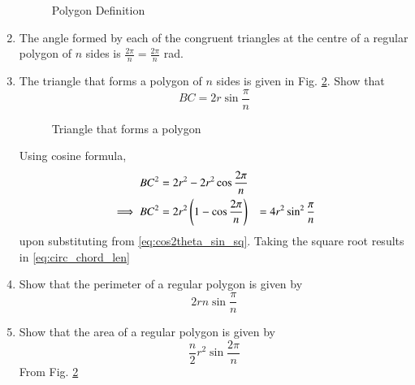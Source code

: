 \begin{enumerate}[label=\arabic*.,ref=\thesubsection.\theenumi]
\begin{figure}[!ht]
\begin{center}
		\resizebox{\columnwidth}{!}{}
	\end{center}
	\caption{Polygon Definition}
	\label{ch5_polygon_def}	
\end{figure}
%
\item
The angle formed by each of the congruent triangles at the centre of a regular polygon of $n$ sides is $\frac{2\pi}{n} = \frac{2\pi}{n}$ rad.
%
\item 	The triangle that forms a polygon of $n$ sides is given in Fig. \ref{ch5_polygon_area}. Show that 
%
\begin{equation}
BC = 2r \sin\frac{\pi}{n}
\label{eq:circ_chord_len}
\end{equation}
%

\begin{figure}[!ht]
	\begin{center}
		
		\resizebox{\columnwidth}{!}{}
	\end{center}
	\caption{Triangle that forms a polygon}
	\label{ch5_polygon_area}	
\end{figure}
%
\solution Using cosine formula, 
%
%
\begin{align}
BC^2 &= 2r^2-2r^2 \cos\frac{2\pi}{n}
\\
\implies BC^2 &= 2r^2\left(1-\cos\frac{2\pi}{n}\right)
&= 4r^2\sin^2\frac{\pi}{n}
\end{align}
%
upon substituting from 	\eqref{eq:cos2theta_sin_sq}.  Taking the square root results in \eqref{eq:circ_chord_len}
%
\item
Show that the perimeter of a regular polygon is given by 
%
\begin{equation}
\label{eq:peri_poly_n}
2rn \sin\frac{\pi}{n}
\end{equation}
%
\item
Show that the area of a regular polygon is given by 
%
\begin{equation}
\frac{n}{2}r^{2}\sin\frac{2\pi}{n}
\end{equation}
%
\solution  From Fig. 	\ref{ch5_polygon_area}	


\end{enumerate}
